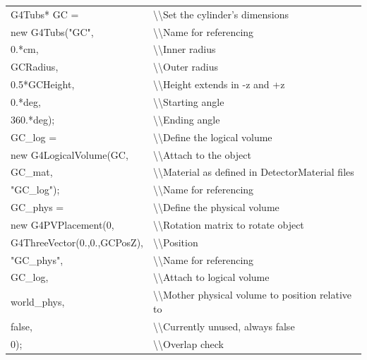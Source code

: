 \documentclass[%
12pt,
twoside,
reprint,
amsmath,amssymb,
aps,
]{article}
\begin{document}
	\begin{table}[!h]
		\begin{tabular}{ll}
			G4Tubs* GC = & \textbackslash\textbackslash Set the cylinder's dimensions \\
			\hspace{5mm} new G4Tubs("GC", & \textbackslash\textbackslash Name for referencing\\
			\hspace{10mm} 0.*cm, & \textbackslash\textbackslash Inner radius \\ 
			\hspace{10mm} GCRadius, & \textbackslash\textbackslash Outer radius \\
			\hspace{10mm} 0.5*GCHeight, & \textbackslash\textbackslash Height extends in -z and +z \\
			\hspace{10mm} 0.*deg, & \textbackslash\textbackslash Starting angle \\
			\hspace{10mm} 360.*deg); & \textbackslash\textbackslash Ending angle \\
			GC\_log = & \textbackslash\textbackslash Define the logical volume \\
			\hspace{5mm} new G4LogicalVolume(GC, & \textbackslash\textbackslash Attach to the object \\
			\hspace{10mm} GC\_mat, & \textbackslash\textbackslash Material as defined in DetectorMaterial files \\
			\hspace{10mm} "GC\_log"); & \textbackslash\textbackslash Name for referencing\\
			GC\_phys = & \textbackslash\textbackslash Define the physical volume \\
			\hspace{5mm} new G4PVPlacement(0, & \textbackslash\textbackslash Rotation matrix to rotate object \\
			\hspace{10mm} G4ThreeVector(0.,0.,GCPosZ), & \textbackslash\textbackslash Position \\
			\hspace{10mm} "GC\_phys", & \textbackslash\textbackslash Name for referencing \\
			\hspace{10mm} GC\_log, & \textbackslash\textbackslash Attach to logical volume \\
			\hspace{10mm} world\_phys, & \textbackslash\textbackslash Mother physical volume to position relative to \\
			\hspace{10mm} false, & \textbackslash\textbackslash Currently unused, always false \\
			\hspace{10mm} 0); & \textbackslash\textbackslash Overlap check \\
		\end{tabular}
	\end{table}
\end{document}
